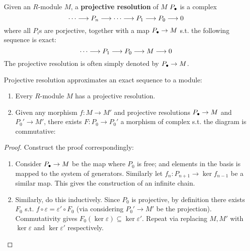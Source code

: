 \begin{definition}
    Given an $R$-module $M$, a \textbf{projective resolution} of $M$ $P_{\bullet}$ is a complex
    \[
        \cdots \longrightarrow P_n \longrightarrow \cdots \longrightarrow P_1 \longrightarrow P_0 \longrightarrow 0
    \]
    where all $P_i$s are porjective, together with a map $P_{\bullet} \to M$ s.t. the following sequence is exact:
    \[
        \cdots \longrightarrow P_1 \longrightarrow P_0 \longrightarrow M \longrightarrow 0
    \]
    The projective resolution is often simply denoted by $P_{\bullet} \to M$.
\end{definition}

\begin{proposition}
    Projective resolution approximates an exact sequence to a module:
    \begin{enumerate}[label=\roman*)]
        \item Every $R$-module $M$ has a projective resolution.
        \item Given any morphism $f: M \to M'$ and projective resolutions $P_{\bullet} \to M$ and $P_0' \to M'$, there exists $F: P_0 \to P_0'$ a morphism of complex s.t. the diagram is commutative:
        \begin{figure}[htbp]
            \centering
        \end{figure}
    \end{enumerate}
\end{proposition}

\begin{proof}
    Construct the proof correspondingly:
    \begin{enumerate}[label=\roman*)]
        \item Consider $P_{\bullet} \to M$ be the map where $P_0$ is free; and elements in the basis is mapped to the system of generators. Similarly let $f_n: P_{n+1} \to \ker f_{n-1}$ be a similar map. This gives the construction of an infinite chain.
        \item Similarly, do this inductively. Since $P_0$ is projective, by definition there exists $F_0$ s.t. $f \circ \varepsilon = \varepsilon' \circ F_0$ (via considering $P_0' \to M'$ be the projection). Commutativity gives $F_0(\ker \varepsilon) \subseteq \ker \varepsilon'$. Repeat via replacing $M, M'$ with $\ker \varepsilon$ and $\ker \varepsilon'$ respectively. 
    \end{enumerate}
\end{proof}

